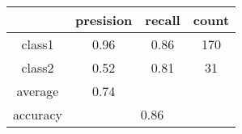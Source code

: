 
    \begin{tabular}{ | c | c | c | c | }
	\hline
	         &presision & recall & count \\ \hline
	class1   & 0.96    & 0.86  & 170 \\ \hline
	class2   & 0.52    & 0.81  & 31 \\ \hline
	average  & 0.74    &        &       \\
	\hline
	accuracy & \multicolumn{3}{c|}{0.86}\\
	\hline
    \end{tabular}